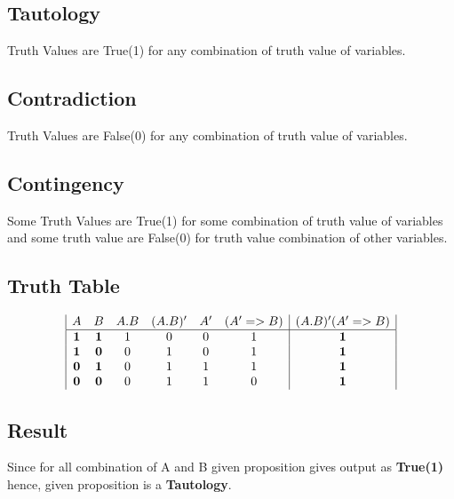 \documentclass{article}
\begin{document}
\subsection{Tautology}
Truth Values are True(1) for any combination of truth value of variables.

\subsection{Contradiction}
Truth Values are False(0) for any combination of truth value of variables.

\subsection{Contingency}
Some Truth Values are True(1) for some combination of truth value of variables and some truth value are False(0) for  truth value combination of other variables.


\subsection{Truth Table}
\begin{displaymath}
\begin{array}{|c c c c c c|c|}
A & B & A . B & (A . B)' &  A' & (A' => B ) &  (A . B)'( A' => B) \\ %
\hline %
\textbf{1} & \textbf{1} & 1 & 0 & 0 & 1 & \textbf{1}\\
\textbf{1} & \textbf{0} & 0 & 1 & 0 & 1 & \textbf{1}\\
\textbf{0} & \textbf{1} & 0 & 1 & 1 & 1 & \textbf{1}\\
\textbf{0} & \textbf{0} & 0 & 1 & 1 & 0 & \textbf{1}\\
\end{array}
\end{displaymath}

\subsection{Result}
Since for all combination of A and B given proposition gives output as \textbf{True(1)} hence, given proposition is a \textbf{Tautology}. 
\end{document}
